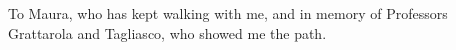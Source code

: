 \begin{dedication}
To Maura, who has kept walking with me, and in memory of Professors Grattarola and Tagliasco, who showed me the path.
\end{dedication}




